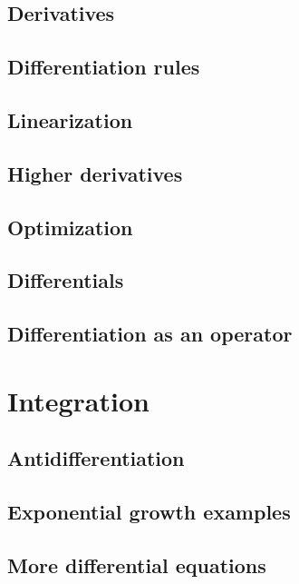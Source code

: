 \documentclass[a4paper]{book}
\begin{document}
\begin{sloppypar}
\section{Derivatives} \label{ChDifferentiationSecDerivatives}
\section{Differentiation rules} \label{ChDifferentiationSecDifferentiationRules}
\section{Linearization} \label{ChDifferentiationSecLinearization}
\section{Higher derivatives} \label{ChDifferentiationSecHigherDerivatives}
\section{Optimization} \label{ChDifferentiationSecOptimization}
\section{Differentials} \label{ChDifferentiationSecDifferentials}
\section{Differentiation as an operator} \label{ChDifferentiationSecDifferentiationAsAnOperator}

\chapter{Integration} \label{ChIntegration}
\section{Antidifferentiation} \label{ChIntegrationSecAntidifferentiation}
\section{Exponential growth examples} \label{ChIntegrationSecExponentialGrowthExamples}
\section{More differential equations} \label{ChIntegrationSecMoreDifferentialEquations}

\end{sloppypar}
\end{document}
